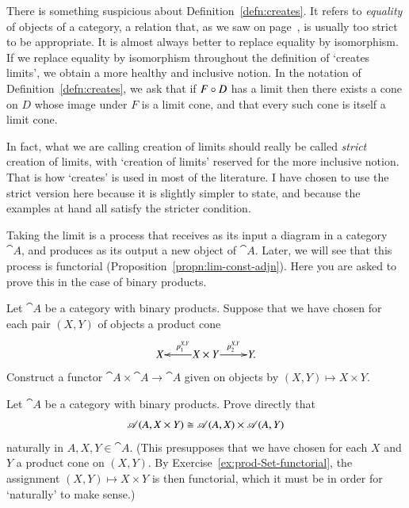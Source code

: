 \begin{remark}
There is something suspicious about Definition~\ref{defn:creates}.  It
refers to \emph{equality} of objects of a category, a relation that, as we
saw on page~\pageref{p:care}, is usually too strict to be appropriate.  It
is almost always better to replace equality by isomorphism.  If we replace
equality by isomorphism throughout the definition of `creates limits', we
obtain a more healthy and inclusive notion.  In the notation of
Definition~\ref{defn:creates}, we ask that if $F \mathbin{\circ} D$ has a limit then
there exists a cone on $D$ whose image under $F$ is a limit cone, and that
every such cone is itself a limit cone.

In fact, what we are calling creation of limits should really be called
\emph{strict} creation of limits, with `creation of limits' reserved for
the more inclusive notion.  That is how `creates' is used in most of the
literature.  I have chosen to use the strict version here because it is
slightly simpler to state, and because the examples at hand all satisfy the
stricter condition.
%
%
%
%
%
%
\end{remark}


\exs


\begin{question}
\label{ex:prod-Set-functorial}
Taking the limit is a process that receives as its input a diagram in a
category $\cat{A}$, and produces as its output a new object of $\cat{A}$.
Later, we will see that this process is functorial%
%
%
(Proposition~\ref{propn:lim-const-adjn}).  Here you are asked to prove this
in the case of binary products.%
%
%

Let $\cat{A}$ be a category with binary products.  Suppose that we have chosen
for each pair $(X, Y)$ of objects a product cone
\[
\xymatrix@1{
X       &X \times Y \ar[l]_{p^{X, Y}_1} \ar[r]^-{p^{X, Y}_2}     &Y.
}
\]
Construct a functor $\cat{A} \times \cat{A} \to \cat{A}$ given on objects
by $(X, Y) \mapsto X \times Y$.
\end{question}


\begin{question}
Let $\cat{A}$ be a category with binary products.  Prove directly that
\[
\mathscr{A}(A, X \times Y)
\cong
\mathscr{A}(A, X) \times \mathscr{A}(A, Y)
\]
naturally in $A, X, Y \in \cat{A}$.  (This presupposes that we have chosen
for each $X$ and $Y$ a product cone on $(X, Y)$.  By
Exercise~\ref{ex:prod-Set-functorial}, the assignment $(X, Y) \mapsto X
\times Y$ is then functorial, which it must be in order for `naturally' to
make sense.)
\end{question}


